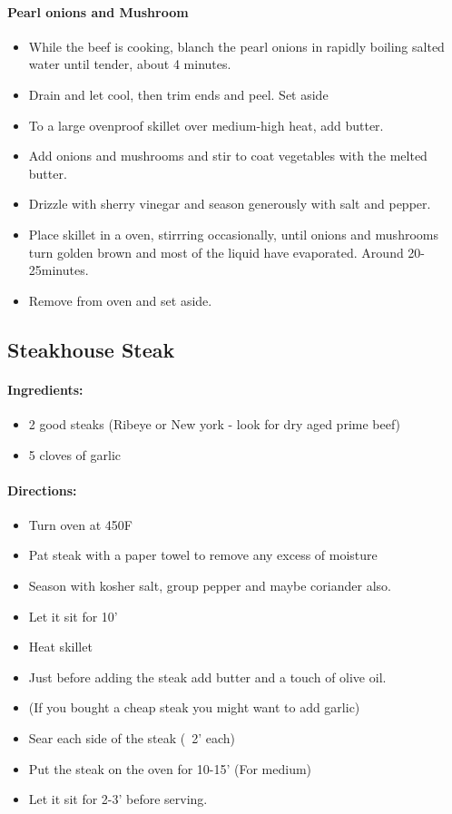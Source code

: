 \documentclass{article}
\begin{document}
\paragraph{Pearl onions and Mushroom}
\begin{itemize}
\item While the beef is cooking, blanch the pearl onions in rapidly boiling salted water until tender, about 4 minutes. \item Drain and let cool, then trim ends and peel. Set aside
\item To a large ovenproof skillet over medium-high heat, add butter.
\item Add onions and mushrooms and stir to coat vegetables with the melted butter.
\item Drizzle with sherry vinegar and season generously with salt and pepper.
\item Place skillet in a oven, stirrring occasionally, until onions and mushrooms turn golden brown and most of the liquid have evaporated. Around 20-25minutes.
\item Remove from oven and set aside.
\end{itemize}

\subsection{Steakhouse Steak}

\paragraph{Ingredients:}

\begin{itemize}
	\item 2 good steaks (Ribeye or New york - look for dry aged prime beef)
	\item 5 cloves of garlic
\end{itemize}

\paragraph{Directions:}
\begin{itemize}
	\item Turn oven at 450F
	\item Pat steak with a paper towel to remove any excess of moisture
	\item Season with kosher salt, group pepper and maybe coriander also.
	\item Let it sit for 10'
	\item Heat skillet
	\item Just before adding the steak add butter and a touch of olive oil.
	\item (If you bought a cheap steak you might want to add garlic)
	\item Sear each side of the steak (~2' each)
	\item Put the steak on the oven for 10-15' (For medium)
	\item Let it sit for 2-3' before serving.
\end{itemize}
\end{document}
